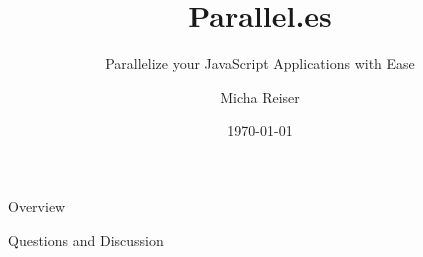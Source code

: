 \documentclass{beamer}
\author{Micha Reiser}
\title{Parallel.es}
\subtitle{Parallelize your JavaScript Applications with Ease}
\institute{HSR}
\date{\today}
\begin{document}
\begin{frame}
	\maketitle
\end{frame}

\begin{frame}{Overview}
	\tableofcontents
\end{frame}









\begin{frame}[standout]
	Questions and Discussion
\end{frame}


\end{document}
